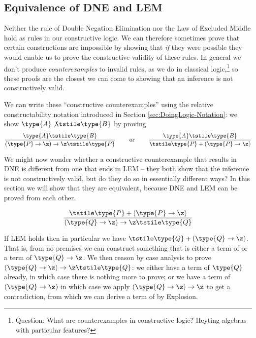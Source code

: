 \subsection{Equivalence of DNE and LEM}

Neither the rule of Double Negation Elimination nor the Law of Excluded Middle hold as rules in our constructive logic.  We can therefore sometimes prove that certain constructions are impossible by showing that \emph{if} they were possible they would enable us to prove the constructive validity of these rules.  In general we don't produce \emph{counterexamples} to invalid rules, as we do in classical logic,\footnote{
Question: What are counterexamples in constructive logic?  Heyting algebras with particular features?
}
so these proofs are the closest we can come to showing that an inference is not constructively valid.

We can write these ``constructive counterexamples'' using the relative constructability notation introduced in Section \ref{sec:DoingLogic-Notation}: we show 
$\type{A} \not\tstile \type{B}$ by proving
\[
\frac{\type{A} \tstile \type{B}
}{
(\type{P} \to \z) \to \z \tstile \type{P}}
%
\quad\quad\mbox{ or }\quad\quad
\frac{\type{A} \tstile \type{B}
}{
\tstile \type{P} + (\type{P} \to \z)}
\]

We might now wonder whether a constructive counterexample that results in DNE is different from one that ends in LEM -- they both show that the inference is not constructively valid, but do they do so in essentially different ways?  In this section we will show that they are equivalent, because DNE and LEM can be proved from each other.

\begin{Theorem}
\[
\frac{
\tstile \type{P} + (\type{P} \to \z)
}{
(\type{Q} \to \z) \to \z \tstile \type{Q}
}
\]
\end{Theorem}
\begin{Proof}
If LEM holds then in particular we have 
$\tstile \type{Q} + (\type{Q} \to \z)$.  That is, from no premises we can construct something that is either a term of  or a term of $\type{Q} \to \z$.  We then reason by case analysis to prove $(\type{Q} \to \z) \to \z \tstile \type{Q}$: we either have a term of $\type{Q}$ already, in which case there is nothing more to prove;  or we have a term of $(\type{Q} \to \z)$ in which case we apply $(\type{Q} \to \z) \to \z$ to get a contradiction, from which we can derive a term of  by  Explosion.
\end{Proof}


